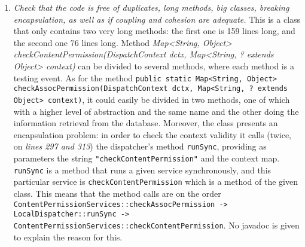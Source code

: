 \begin{enumerate}
			\item \textit{Check that the code is free of duplicates, long methods, big classes, breaking encapsulation, as well as if coupling and cohesion are adequate.}\newline
			This is a class that only contains two very long methods: the first one is 159 lines long, and the second one 76 lines long. Method \textit{Map<String, Object> checkContentPermission(DispatchContext dctx, Map<String, ? extends Object> context)} can be divided to several methods, where each method is a testing event. As for the method \texttt{public static Map<String, Object> checkAssocPermission(DispatchContext dctx, Map<String, ? extends Object> context)}, it could easily be divided in two methods, one of which with a higher level of abstraction and the same name and the other doing the information retrieval from the database. \newline
			Moreover, the class presents an encapsulation problem: in order to check the context validity it calls (twice, on \textit{lines 297 and 313}) the dispatcher's method \texttt{runSync}, providing as parameters the string \texttt{"checkContentPermission"} and the context map. \texttt{runSync} is a method that runs a given service synchronously, and this particular service is \texttt{checkContentPermission} which is a method of the given class. This means that the method calls are on the order \texttt{ContentPermissionServices::checkAssocPermission -> LocalDispatcher::runSync -> ContentPermissionServices::checkContentPermission}. No javadoc is given to explain the reason for this.
			
		\end{enumerate}

